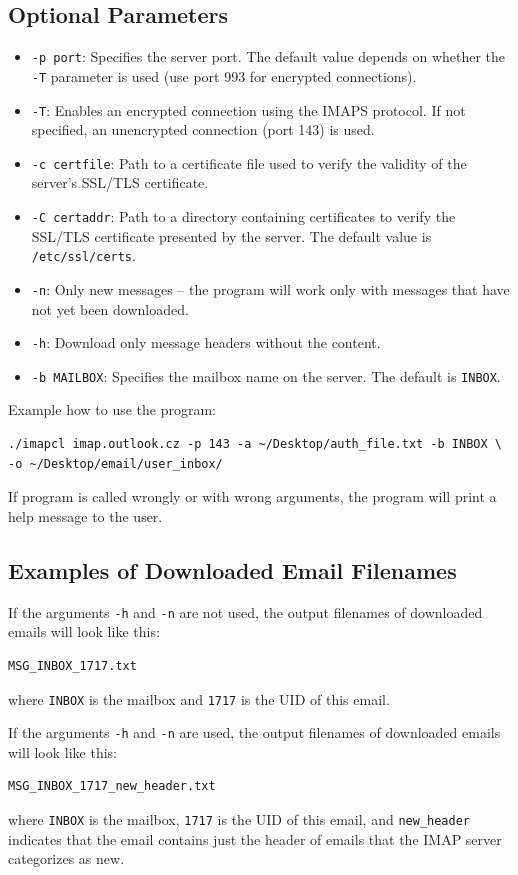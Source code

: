\documentclass[a4paper,11pt]{article}
\begin{document}
\subsection{Optional Parameters}
\begin{itemize}
    \item \texttt{-p port}: Specifies the server port. The default value depends on whether the \texttt{-T} parameter is used (use port 993 for encrypted connections).
    \item \texttt{-T}: Enables an encrypted connection using the IMAPS protocol. If not specified, an unencrypted connection (port 143) is used.
    \item \texttt{-c certfile}: Path to a certificate file used to verify the validity of the server’s SSL/TLS certificate.
    \item \texttt{-C certaddr}: Path to a directory containing certificates to verify the SSL/TLS certificate presented by the server. The default value is \texttt{/etc/ssl/certs}.
    \item \texttt{-n}: Only new messages – the program will work only with messages that have not yet been downloaded.
    \item \texttt{-h}: Download only message headers without the content.
    \item \texttt{-b MAILBOX}: Specifies the mailbox name on the server. The default is \texttt{INBOX}.
\end{itemize}

Example how to use the program:

\begin{verbatim}
./imapcl imap.outlook.cz -p 143 -a ~/Desktop/auth_file.txt -b INBOX \
-o ~/Desktop/email/user_inbox/
\end{verbatim}

If program is called wrongly or with wrong arguments, the program will print a help message to the user.

\subsection{Examples of Downloaded Email Filenames}
If the arguments \texttt{-h} and \texttt{-n} are not used, the output filenames of downloaded emails will look like this:
\begin{verbatim}
MSG_INBOX_1717.txt
\end{verbatim}
where \texttt{INBOX} is the mailbox and \texttt{1717} is the UID of this email.

If the arguments \texttt{-h} and \texttt{-n} are used, the output filenames of downloaded emails will look like this:
\begin{verbatim}
MSG_INBOX_1717_new_header.txt
\end{verbatim}
where \texttt{INBOX} is the mailbox, \texttt{1717} is the UID of this email, and \texttt{new\_header} indicates that the email contains just the header of emails that the IMAP server categorizes as new.
\end{document}
